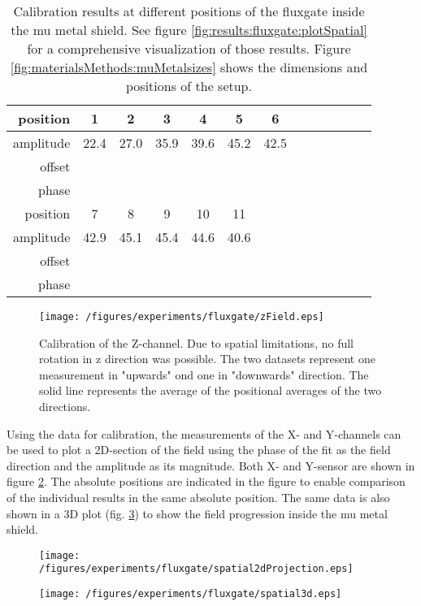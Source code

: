         \begin{table}
            \centering
            \label{table:results:calibrationFitParams}
            \begin{tabular}{r|cccccccccccc}
                \label{table:results:calibrationFitParams}
                position & 1& 2 & 3 & 4 & 5 & 6\\
                \hline
                amplitude & 22.4 & 27.0 & 35.9 & 39.6 & 45.2 & 42.5\\
                offset \\
                phase \\
                \hline
                position & 7 & 8 & 9 & 10 & 11 \\
                \hline
                amplitude & 42.9 & 45.1 & 45.4 & 44.6 & 40.6\\
                offset \\
                phase
            \end{tabular}
            \caption[Fluxgate calibration results]{Calibration results at different positions of the fluxgate inside the mu metal shield. See figure \ref{fig:results:fluxgate:plotSpatial} for a comprehensive visualization of those results. Figure \ref{fig:materialsMethods:muMetalsizes} shows the dimensions and positions of the setup.}
        \end{table}
        \begin{figure}
            \label{fig:results:fluxgate:zcal}
            \centering
            \texttt{[image: /figures/experiments/fluxgate/zField.eps]}
            \caption[calibration results Z]{Calibration of the Z-channel. Due to spatial limitations, no full rotation in z direction was possible. The two datasets represent one measurement in "upwards" ond one in "downwards" direction. The solid line represents the average of the positional averages of the two directions.}
        \end{figure}
        Using the data for calibration, the measurements of the X- and Y-channels can be used to plot a 2D-section of the field using the phase of the fit as the field direction and the amplitude as its magnitude. Both X- and Y-sensor are shown in figure \ref{fig:results:fluxgate:plotSpatial2d}. The absolute positions are indicated in the figure to enable comparison of the individual results in the same absolute position. The same data is also shown in a 3D plot (fig. \ref{fig:results:fluxgate:plotSpatial3d}) to show the field progression inside the mu metal shield.
        \begin{figure}
            \label{fig:results:fluxgate:plotSpatial2d}
            \centering
            \texttt{[image: /figures/experiments/fluxgate/spatial2dProjection.eps]}
        \end{figure}
        \begin{figure}
            \label{fig:results:fluxgate:plotSpatial3d}
            \centering
            \texttt{[image: /figures/experiments/fluxgate/spatial3d.eps]}
        \end{figure}
